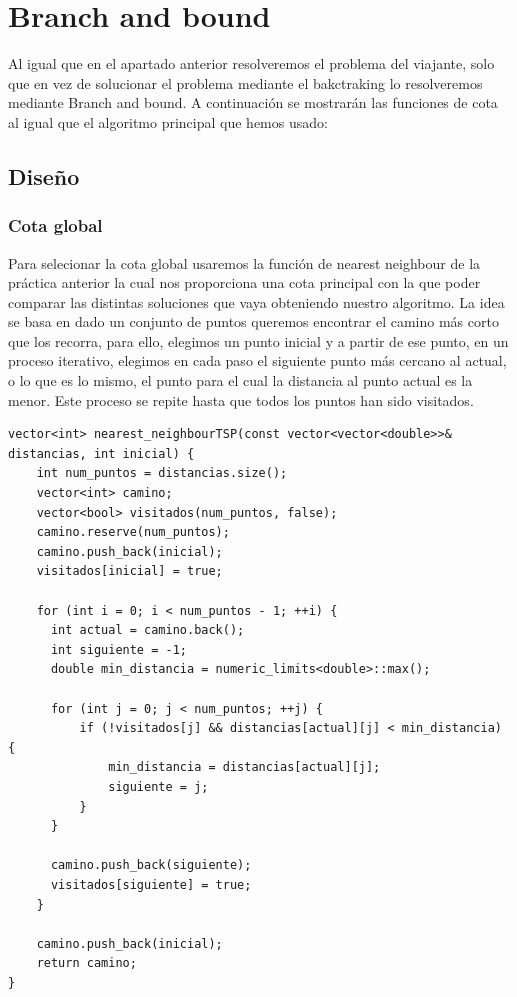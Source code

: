 \documentclass[11pt,openany]{book}
\begin{document}
\chapter{Branch and bound}
Al igual que en el apartado anterior resolveremos el problema del viajante, solo que en vez de solucionar el problema mediante el bakctraking 
lo resolveremos mediante Branch and bound. A continuación se mostrarán las funciones de cota al igual que el algoritmo principal que hemos usado:

\section{Diseño}
\subsection{Cota global}
Para selecionar la cota global usaremos la función de nearest neighbour de la práctica anterior la cual 
nos proporciona una cota principal con la que poder comparar las distintas soluciones que vaya obteniendo nuestro algoritmo.
La idea se basa en dado un conjunto de puntos queremos encontrar el camino más corto que los recorra,
para ello, elegimos un punto inicial y a partir de ese punto, en un proceso iterativo, elegimos en cada paso el
siguiente punto más cercano al actual, o lo que es lo mismo, el punto para el cual la distancia al punto actual es
la menor. Este proceso se repite hasta que todos los puntos han sido visitados.

\begin{lstlisting}
vector<int> nearest_neighbourTSP(const vector<vector<double>>& distancias, int inicial) {
    int num_puntos = distancias.size();
    vector<int> camino;
    vector<bool> visitados(num_puntos, false);
    camino.reserve(num_puntos);
    camino.push_back(inicial);
    visitados[inicial] = true;

    for (int i = 0; i < num_puntos - 1; ++i) {
      int actual = camino.back();
      int siguiente = -1;
      double min_distancia = numeric_limits<double>::max();

      for (int j = 0; j < num_puntos; ++j) {
          if (!visitados[j] && distancias[actual][j] < min_distancia) {
              min_distancia = distancias[actual][j];
              siguiente = j;
          }
      }

      camino.push_back(siguiente);
      visitados[siguiente] = true;
    }

    camino.push_back(inicial);
    return camino;
}

\end{lstlisting} 
\end{document}
